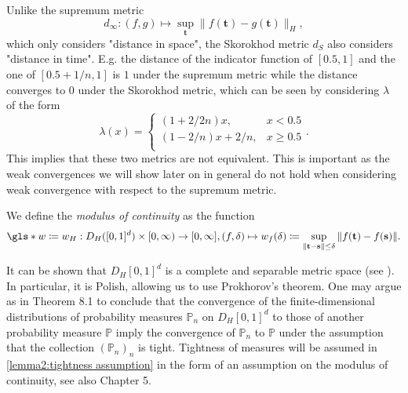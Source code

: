 \begin{remark}
    Unlike the supremum metric
    \[ d_\infty: (f, g) \mapsto \sup\limits_{\mathbf{t}} \|f(\mathbf{t}) - g(\mathbf{t}) \|_H, \]
    which only considers "distance in space", the Skorokhod metric $d_S$ also considers "distance in time". E.g. the distance of the indicator function of $[0.5, 1]$ and the one of $[0.5+1/n, 1]$ is $1$ under the supremum metric while the distance converges to $0$ under the Skorokhod metric, which can be seen by considering $\lambda$ of the form
    \[ \lambda(x) = \left\{\begin{array}{ll} 
        (1 + 2/2n)x, & x < 0.5 \\
        (1-2/n)x + 2/n, & x \geq 0.5 \\
        \end{array}
        \right. . \]
    This implies that these two metrics are not equivalent. This is important as the weak convergences we will show later on in general do not hold when considering weak convergence with respect to the supremum metric.
\end{remark}

\begin{defn} \label{defn:modulus of continuity}
   We define the \textit{modulus of continuity} as the function
   \[ \gls*{w} \coloneqq w_H: D_{H}([0, 1]^d) \times [0, \infty) \to [0, \infty], (f, \delta) \mapsto w_f(\delta) \coloneqq \sup\limits_{\| \mathbf{t} - \mathbf{s}\| \leq \delta} \| f(\mathbf{t}) - f(\mathbf{s})\|. \]
\end{defn}

\begin{remark}
    It can be shown that $D_H[0, 1]^d$ is a complete and separable metric space (see \cite{neuhaus1971weak}). In particular, it is Polish, allowing us to use Prokhorov's theorem. One may argue as in \cite{[4]billingsley1968convergence} Theorem 8.1 to conclude that the convergence of the finite-dimensional distributions of probability measures $\mathbb{P}_n$ on $D_H[0, 1]^d$ to those of another probability measure $\mathbb{P}$ imply the convergence of $\mathbb{P}_n$ to $\mathbb{P}$ under the assumption that the collection $(\mathbb{P}_n)_n$ is tight. Tightness of measures will be assumed in \eqref{lemma2:tightness assumption} in the form of an assumption on the modulus of continuity, see also \cite{[11]bulinksi2007limittheorems} Chapter 5.
\end{remark}
